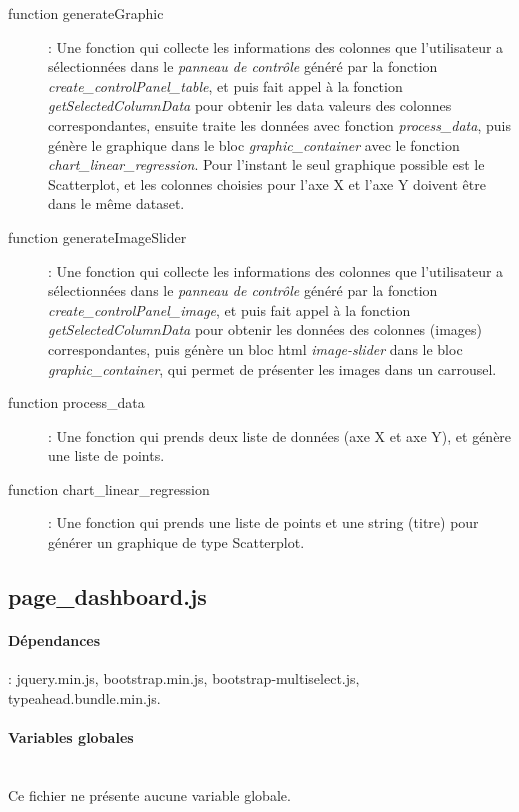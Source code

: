 \documentclass[a4paper]{report}
\begin{document}
\begin{description}
	\item[function generateGraphic]: Une fonction qui collecte les informations des colonnes que l'utilisateur a sélectionnées dans le \emph{panneau de contrôle} généré par la fonction \emph{create\_controlPanel\_table}, et puis fait appel à la fonction \emph{getSelectedColumnData} pour obtenir les data valeurs des colonnes correspondantes, ensuite traite les données avec fonction \emph{process\_data}, puis génère le graphique dans le bloc \emph{graphic\_container} avec le fonction \emph{chart\_linear\_regression}. Pour l'instant le seul graphique possible est le Scatterplot, et les colonnes choisies pour l'axe X et l'axe Y doivent être dans le même dataset.
	
	\item[function generateImageSlider]: Une fonction qui collecte les informations des colonnes que l'utilisateur a sélectionnées dans le \emph{panneau de contrôle} généré par la fonction \emph{create\_controlPanel\_image}, et puis fait appel à la fonction \emph{getSelectedColumnData} pour obtenir les données des colonnes (images) correspondantes, puis génère un bloc html \emph{image-slider} dans le bloc \emph{graphic\_container}, qui permet de présenter les images dans un carrousel.
	
	\item[function process\_data]: Une fonction qui prends deux liste de données (axe X et axe Y), et génère une liste de points.
	
	\item[function chart\_linear\_regression]: Une fonction qui prends une liste de points et une string (titre) pour générer un graphique de type Scatterplot. 
\end{description}

\subsection{page\_dashboard.js}
\paragraph{Dépendances} : jquery.min.js, bootstrap.min.js, bootstrap-multiselect.js, typeahead.bundle.min.js.

\paragraph{Variables globales}~\\
Ce fichier ne présente aucune variable globale.
\end{document}
